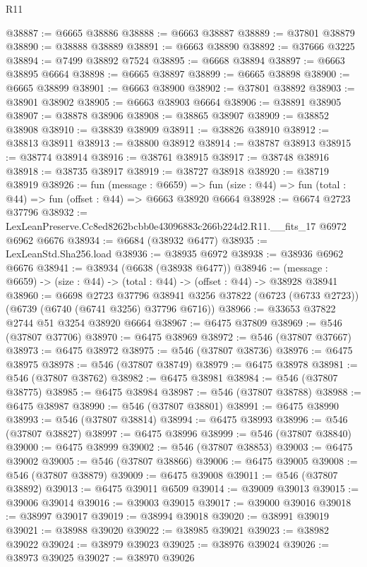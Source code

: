 \begin{lexlean}{R11}
\begin{coremodule}
@38887 := @6665 @38886
@38888 := @6663 @38887
@38889 := @37801 @38879
@38890 := @38888 @38889
@38891 := @6663 @38890
@38892 := @37666 @3225
@38894 := @7499 @38892 @7524
@38895 := @6668 @38894
@38897 := @6663 @38895 @6664
@38898 := @6665 @38897
@38899 := @6665 @38898
@38900 := @6665 @38899
@38901 := @6663 @38900
@38902 := @37801 @38892
@38903 := @38901 @38902
@38905 := @6663 @38903 @6664
@38906 := @38891 @38905
@38907 := @38878 @38906
@38908 := @38865 @38907
@38909 := @38852 @38908
@38910 := @38839 @38909
@38911 := @38826 @38910
@38912 := @38813 @38911
@38913 := @38800 @38912
@38914 := @38787 @38913
@38915 := @38774 @38914
@38916 := @38761 @38915
@38917 := @38748 @38916
@38918 := @38735 @38917
@38919 := @38727 @38918
@38920 := @38719 @38919
@38926 := fun (message : @6659) =>
  fun (size : @44) => fun (total : @44) => fun (offset : @44) => @6663 @38920 @6664
@38928 := @6674 @2723 @37796
@38932 := LexLeanPreserve.Cc8ed8262bcbb0e43096883c266b224d2.R11.__fits_17 @6972 @6962 @6676
@38934 := @6684 (@38932 @6477)
@38935 := LexLeanStd.Sha256.load
@38936 := @38935 @6972
@38938 := @38936 @6962 @6676
@38941 := @38934 (@6638 (@38938 @6477))
@38946 := (message : @6659) -> (size : @44) -> (total : @44) -> (offset : @44) -> @38928 @38941
@38960 := @6698
    @2723
    @37796
    @38941
    @3256
    @37822
    (@6723 (@6733 @2723))
    (@6739 (@6740 (@6741 @3256) @37796 @6716))
@38966 := @33653 @37822 @2744 @51 @3254 @38920 @6664
@38967 := @6475 @37809
@38969 := @546 (@37807 @37706)
@38970 := @6475 @38969
@38972 := @546 (@37807 @37667)
@38973 := @6475 @38972
@38975 := @546 (@37807 @38736)
@38976 := @6475 @38975
@38978 := @546 (@37807 @38749)
@38979 := @6475 @38978
@38981 := @546 (@37807 @38762)
@38982 := @6475 @38981
@38984 := @546 (@37807 @38775)
@38985 := @6475 @38984
@38987 := @546 (@37807 @38788)
@38988 := @6475 @38987
@38990 := @546 (@37807 @38801)
@38991 := @6475 @38990
@38993 := @546 (@37807 @38814)
@38994 := @6475 @38993
@38996 := @546 (@37807 @38827)
@38997 := @6475 @38996
@38999 := @546 (@37807 @38840)
@39000 := @6475 @38999
@39002 := @546 (@37807 @38853)
@39003 := @6475 @39002
@39005 := @546 (@37807 @38866)
@39006 := @6475 @39005
@39008 := @546 (@37807 @38879)
@39009 := @6475 @39008
@39011 := @546 (@37807 @38892)
@39013 := @6475 @39011 @6509
@39014 := @39009 @39013
@39015 := @39006 @39014
@39016 := @39003 @39015
@39017 := @39000 @39016
@39018 := @38997 @39017
@39019 := @38994 @39018
@39020 := @38991 @39019
@39021 := @38988 @39020
@39022 := @38985 @39021
@39023 := @38982 @39022
@39024 := @38979 @39023
@39025 := @38976 @39024
@39026 := @38973 @39025
@39027 := @38970 @39026

\end{coremodule}
\end{lexlean}
